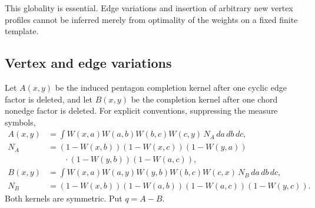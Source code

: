 This globality is essential. Edge variations and insertion of arbitrary
new vertex profiles cannot be inferred merely from optimality of the
weights on a fixed finite template.

\subsection{Vertex and edge variations}

Let \(A(x,y)\) be the induced pentagon completion kernel after one cyclic
edge factor is deleted, and let \(B(x,y)\) be the completion kernel after
one chord nonedge factor is deleted. For explicit conventions, suppressing
the measure symbols,
\begin{align*}
 A(x,y)&=\int W(x,a)W(a,b)W(b,c)W(c,y)\,N_A\,da\,db\,dc,\\
 N_A&=(1-W(x,b))(1-W(x,c))(1-W(y,a))\\
    &\hspace{2em}\cdot(1-W(y,b))(1-W(a,c)),\\
 B(x,y)&=\int W(x,a)W(a,y)W(y,b)W(b,c)W(c,x)\,N_B\,da\,db\,dc,\\
 N_B&=(1-W(x,b))(1-W(a,b))(1-W(a,c))(1-W(y,c)).
\end{align*}
Both kernels are symmetric. Put \(q=A-B\).

